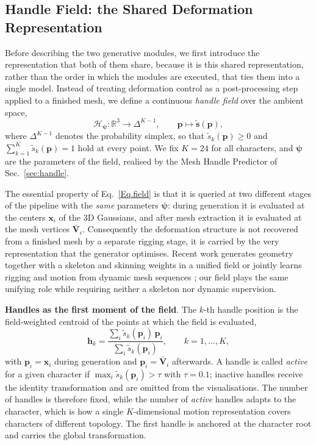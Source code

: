 \documentclass[lettersize,journal]{IEEEtran}
\begin{document}
\subsection{Handle Field: the Shared Deformation Representation} \label{sec:field}
Before describing the two generative modules, we first introduce the representation that
both of them share, because it is this shared representation, rather than the order in which
the modules are executed, that ties them into a single model. Instead of treating
deformation control as a post-processing step applied to a finished mesh, we define a
continuous \textit{handle field} over the ambient space,
\begin{equation} \label{Eq.field}
\mathcal{H}_{\bm{\psi}} : \mathbb{R}^{3} \to \Delta^{K-1},
\qquad
\bm{p} \mapsto \tilde{\bm{s}}(\bm{p}),
\end{equation}
where $\Delta^{K-1}$ denotes the probability simplex, so that $\tilde{s}_{k}(\bm{p}) \geq 0$
and $\sum_{k=1}^{K}\tilde{s}_{k}(\bm{p})=1$ hold at every point. We fix $K=24$ for all
characters, and $\bm{\psi}$ are the parameters of the field, realised by the Mesh Handle
Predictor of Sec.~\ref{sec:handle}.

The essential property of Eq.~\ref{Eq.field} is that it is queried at two different stages of
the pipeline with the \textit{same} parameters $\bm{\psi}$: during generation it is evaluated
at the centers $\bm{x}_{i}$ of the 3D Gaussians, and after mesh extraction it is evaluated at
the mesh vertices $\bar{\bm{V}}_{i}$. Consequently the deformation structure is not recovered
from a finished mesh by a separate rigging stage, it is carried by the very representation
that the generator optimises. Recent work generates geometry together with a skeleton and
skinning weights in a unified field \cite{huang2026anigen,rigel3d2026} or jointly learns
rigging and motion from dynamic mesh sequences \cite{zhang2026rigmo}; our field plays the
same unifying role while requiring neither a skeleton nor dynamic supervision.

\textbf{Handles as the first moment of the field}. The $k$-th handle position is the
field-weighted centroid of the points at which the field is evaluated,
\begin{equation} \label{Eq.moment}
\bm{h}_{k}=\frac{\sum_{i}\tilde{s}_{k}(\bm{p}_{i})\,\bm{p}_{i}}
{\sum_{i}\tilde{s}_{k}(\bm{p}_{i})},
\qquad k=1,\dots,K,
\end{equation}
with $\bm{p}_{i}=\bm{x}_{i}$ during generation and $\bm{p}_{i}=\bar{\bm{V}}_{i}$ afterwards.
A handle is called \textit{active} for a given character if
$\max_{i}\tilde{s}_{k}(\bm{p}_{i})>\tau$ with $\tau=0.1$; inactive handles receive the
identity transformation and are omitted from the visualisations. The number of handles is
therefore fixed, while the number of \textit{active} handles adapts to the character, which
is how a single $K$-dimensional motion representation covers characters of different topology.
The first handle is anchored at the character root and carries the global transformation.
\end{document}

